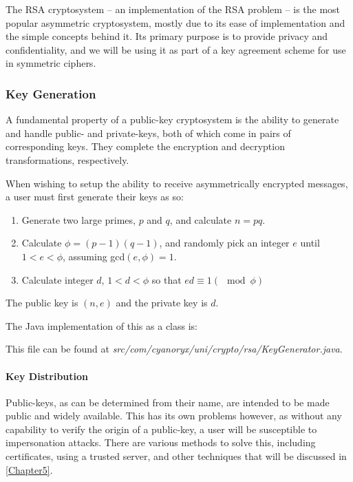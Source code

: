     The RSA cryptosystem -- an implementation of the RSA problem -- is the most popular asymmetric cryptosystem, mostly due to its ease of implementation and the simple concepts behind it. Its primary purpose is to provide privacy and confidentiality, and we will be using it as part of a key agreement scheme for use in symmetric ciphers.
     
    \subsubsection{Key Generation}
    \label{subsubsec:rsa_keygen}
    
    A fundamental property of a public-key cryptosystem is the ability to generate and handle public- and private-keys, both of which come in pairs of corresponding keys. They complete the encryption and decryption transformations, respectively. 
    
    When wishing to setup the ability to receive asymmetrically encrypted messages, a user must first generate their keys as so:
    
    \begin{enumerate}
      \item Generate two large primes, $p$ and $q$, and calculate $n=pq$.
      \item Calculate $\phi = (p-1)(q-1)$, and randomly pick an integer $e$ until $1 < e < \phi$, assuming gcd$(e,\phi)=1$.
      \item Calculate integer $d$, $1 < d < \phi$ so that $ed \equiv 1 (\mod{\phi})$
    \end{enumerate}
    
    The public key is $(n,e)$ and the private key is $d$.
    
    The Java implementation of this as a class is:
    
    
    This file can be found at \emph{src/com/cyanoryx/uni/crypto/rsa/KeyGenerator.java}.
    
    \paragraph{Key Distribution} Public-keys, as can be determined from their name, are intended to be made public and widely available. This has its own problems however, as without any capability to verify the origin of a public-key, a user will be susceptible to impersonation attacks. There are various methods to solve this, including certificates, using a trusted server, and other techniques that will be discussed in \textsection\ref{Chapter5}.
    
